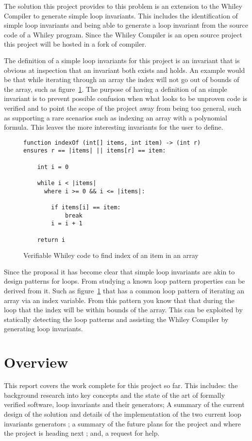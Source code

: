 The solution this project provides to this problem is an extension to
the Whiley Compiler to generate simple loop invariants.
This includes the identification of simple loop invariants and being able
to generate a loop invariant from the source code of a Whiley program.
Since the Whiley Compiler is an open source project this project will be
hosted in a fork of compiler.

The definition of a simple loop invariants for this project is an invariant that is
obvious at inspection that an invariant both exists and holds.
An example would be that while iterating through an array the index
will not go out of bounds of the array, such as figure~\ref{lst:whiley-ex-1}.
The purpose of having a definition of an simple invariant is to prevent
possible confusion when what looks to be unproven code is verified and to point
the scope of the project away from being too general, such as supporting
a rare scenarios such as indexing an array with a polynomial formula.
This leaves the more interesting invariants for the user to define.

\begin{figure}[ht]
\begin{lstlisting}
function indexOf (int[] items, int item) -> (int r)
ensures r == |items| || items[r] == item:

    int i = 0

    while i < |items|
      where i >= 0 && i <= |items|:

        if items[i] == item:
            break
        i = i + 1

    return i
\end{lstlisting}
\caption{Verifiable Whiley code to find index of an item in an array}
\label{lst:whiley-ex-1}
\end{figure}

Since the proposal it has become clear that simple loop invariants are
akin to design patterns for loops.
From studying a known loop pattern properties can be derived from it.
Such as figure~\ref{lst:whiley-ex-1} that has a common loop pattern of
iterating an array via an index variable.
From this pattern you know that that during the loop that the index will be
within bounds of the array.
This can be exploited by statically detecting the loop patterns and assisting
the Whiley Compiler by generating loop invariants.

\section{Overview}

This report covers the work complete for this project so far.
This includes: the background research into key concepts and the state of the
art of formally verified software, loop invariants and their generators;
A summary of the current design of the solution and details of the
implementation of the two current loop invariants generators ;
a summary of the future plans for the project and where the project
is heading next ; and, a request for help.


